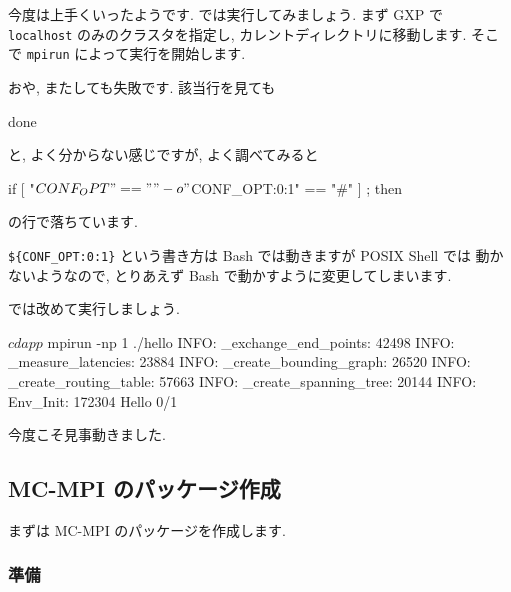 \documentclass[mingoth,a4paper]{jsarticle}
\begin{document}
今度は上手くいったようです.
では実行してみましょう.
まず GXP で \verb|localhost| のみのクラスタを指定し, カレントディレクトリに移動します.
そこで \verb|mpirun| によって実行を開始します.


おや, またしても失敗です.
該当行を見ても

\begin{commandline}
done
\end{commandline}

と, よく分からない感じですが, よく調べてみると

\begin{commandline}
        if [ "$CONF_OPT" == "" -o "${CONF_OPT:0:1}" == "#" ] ; then
\end{commandline}

の行で落ちています.

\verb|${CONF_OPT:0:1}| という書き方は Bash では動きますが POSIX Shell では
動かないようなので, とりあえず Bash で動かすように変更してしまいます.


では改めて実行しましょう.

\begin{commandline}
$ cd app
$ mpirun -np 1 ./hello
INFO: _exchange_end_points: 42498
INFO: _measure_latencies: 23884
INFO: _create_bounding_graph: 26520
INFO: _create_routing_table: 57663
INFO: _create_spanning_tree: 20144
INFO: Env_Init: 172304
Hello 0/1
\end{commandline}

今度こそ見事動きました.

\subsection{MC-MPI のパッケージ作成}

まずは MC-MPI のパッケージを作成します.

\subsubsection{準備}
\end{document}
